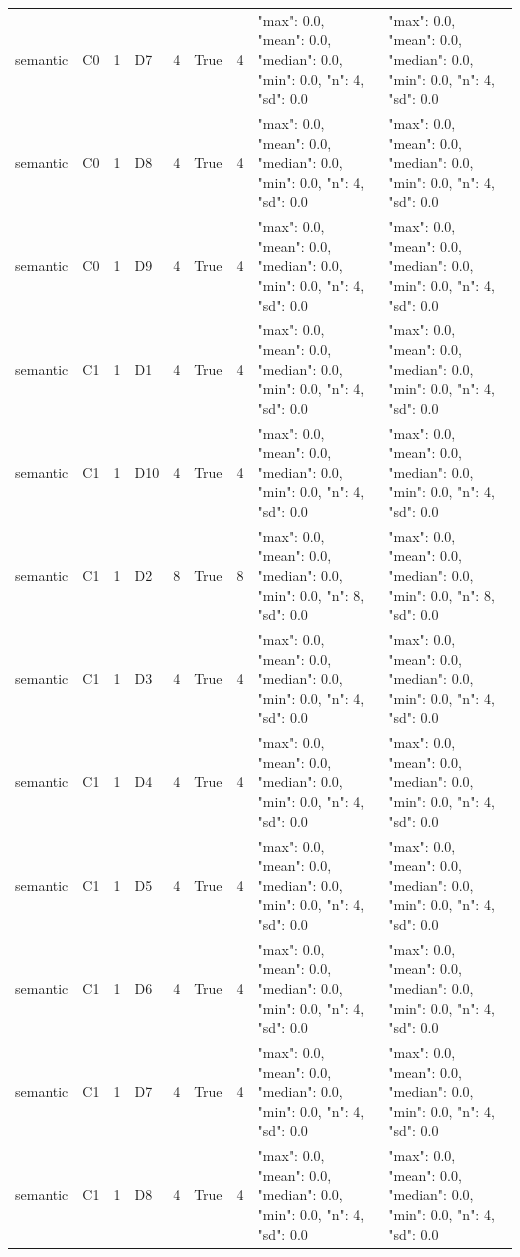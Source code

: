 \begin{tabular}{lllllllll}
semantic & C0 & 1 & D7 & 4 & True & 4 & {"max": 0.0, "mean": 0.0, "median": 0.0, "min": 0.0, "n": 4, "sd": 0.0} & {"max": 0.0, "mean": 0.0, "median": 0.0, "min": 0.0, "n": 4, "sd": 0.0} \\
semantic & C0 & 1 & D8 & 4 & True & 4 & {"max": 0.0, "mean": 0.0, "median": 0.0, "min": 0.0, "n": 4, "sd": 0.0} & {"max": 0.0, "mean": 0.0, "median": 0.0, "min": 0.0, "n": 4, "sd": 0.0} \\
semantic & C0 & 1 & D9 & 4 & True & 4 & {"max": 0.0, "mean": 0.0, "median": 0.0, "min": 0.0, "n": 4, "sd": 0.0} & {"max": 0.0, "mean": 0.0, "median": 0.0, "min": 0.0, "n": 4, "sd": 0.0} \\
semantic & C1 & 1 & D1 & 4 & True & 4 & {"max": 0.0, "mean": 0.0, "median": 0.0, "min": 0.0, "n": 4, "sd": 0.0} & {"max": 0.0, "mean": 0.0, "median": 0.0, "min": 0.0, "n": 4, "sd": 0.0} \\
semantic & C1 & 1 & D10 & 4 & True & 4 & {"max": 0.0, "mean": 0.0, "median": 0.0, "min": 0.0, "n": 4, "sd": 0.0} & {"max": 0.0, "mean": 0.0, "median": 0.0, "min": 0.0, "n": 4, "sd": 0.0} \\
semantic & C1 & 1 & D2 & 8 & True & 8 & {"max": 0.0, "mean": 0.0, "median": 0.0, "min": 0.0, "n": 8, "sd": 0.0} & {"max": 0.0, "mean": 0.0, "median": 0.0, "min": 0.0, "n": 8, "sd": 0.0} \\
semantic & C1 & 1 & D3 & 4 & True & 4 & {"max": 0.0, "mean": 0.0, "median": 0.0, "min": 0.0, "n": 4, "sd": 0.0} & {"max": 0.0, "mean": 0.0, "median": 0.0, "min": 0.0, "n": 4, "sd": 0.0} \\
semantic & C1 & 1 & D4 & 4 & True & 4 & {"max": 0.0, "mean": 0.0, "median": 0.0, "min": 0.0, "n": 4, "sd": 0.0} & {"max": 0.0, "mean": 0.0, "median": 0.0, "min": 0.0, "n": 4, "sd": 0.0} \\
semantic & C1 & 1 & D5 & 4 & True & 4 & {"max": 0.0, "mean": 0.0, "median": 0.0, "min": 0.0, "n": 4, "sd": 0.0} & {"max": 0.0, "mean": 0.0, "median": 0.0, "min": 0.0, "n": 4, "sd": 0.0} \\
semantic & C1 & 1 & D6 & 4 & True & 4 & {"max": 0.0, "mean": 0.0, "median": 0.0, "min": 0.0, "n": 4, "sd": 0.0} & {"max": 0.0, "mean": 0.0, "median": 0.0, "min": 0.0, "n": 4, "sd": 0.0} \\
semantic & C1 & 1 & D7 & 4 & True & 4 & {"max": 0.0, "mean": 0.0, "median": 0.0, "min": 0.0, "n": 4, "sd": 0.0} & {"max": 0.0, "mean": 0.0, "median": 0.0, "min": 0.0, "n": 4, "sd": 0.0} \\
semantic & C1 & 1 & D8 & 4 & True & 4 & {"max": 0.0, "mean": 0.0, "median": 0.0, "min": 0.0, "n": 4, "sd": 0.0} & {"max": 0.0, "mean": 0.0, "median": 0.0, "min": 0.0, "n": 4, "sd": 0.0} \\

\end{tabular}
